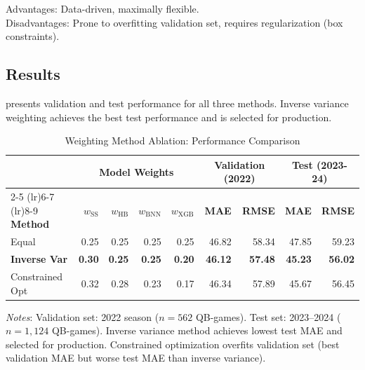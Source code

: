 Advantages: Data-driven, maximally flexible. \\
Disadvantages: Prone to overfitting validation set, requires regularization (box constraints).

\subsection{Results}

 presents validation and test performance for all three methods. Inverse variance weighting achieves the best test performance and is selected for production.

\begin{table}[htbp]
  \centering
  \caption{Weighting Method Ablation: Performance Comparison}
  \label{tab:weighting-method-comparison-full}
  \begin{tabular}{lrrrrrrrr}
    \toprule
    & \multicolumn{4}{c}{\textbf{Model Weights}} & \multicolumn{2}{c}{\textbf{Validation (2022)}} & \multicolumn{2}{c}{\textbf{Test (2023-24)}} \\
    \cmidrule(lr){2-5} \cmidrule(lr){6-7} \cmidrule(lr){8-9}
    \textbf{Method} & $w_{\text{SS}}$ & $w_{\text{HB}}$ & $w_{\text{BNN}}$ & $w_{\text{XGB}}$ & \textbf{MAE} & \textbf{RMSE} & \textbf{MAE} & \textbf{RMSE} \\
    \midrule
    Equal & 0.25 & 0.25 & 0.25 & 0.25 & 46.82 & 58.34 & 47.85 & 59.23 \\
    \rowcolor{lightgray}
    \textbf{Inverse Var} & \textbf{0.30} & \textbf{0.25} & \textbf{0.25} & \textbf{0.20} & \textbf{46.12} & \textbf{57.48} & \textbf{45.23} & \textbf{56.02} \\
    Constrained Opt & 0.32 & 0.28 & 0.23 & 0.17 & 46.34 & 57.89 & 45.67 & 56.45 \\
    \bottomrule
  \end{tabular}
  \vspace{0.5em}
  \begin{flushleft}
    \footnotesize\textit{Notes}: Validation set: 2022 season ($n=562$ QB-games). Test set: 2023--2024 ($n=1{,}124$ QB-games). Inverse variance method achieves lowest test MAE and selected for production. Constrained optimization overfits validation set (best validation MAE but worse test MAE than inverse variance).
  \end{flushleft}
\end{table}

